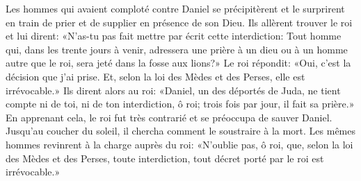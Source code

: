 Les hommes qui avaient comploté contre Daniel se précipitèrent
	et le surprirent en train de prier et de supplier en présence de son Dieu.
Ils allèrent trouver le roi et lui dirent:
	«N’as-tu pas fait mettre par écrit cette interdiction:
	Tout homme qui, dans les trente jours à venir,
		adressera une prière à un dieu ou à un homme autre que le roi,
	sera jeté dans la fosse aux lions?»
Le roi répondit: «Oui, c’est la décision que j’ai prise.
	Et, selon la loi des Mèdes et des Perses, elle est irrévocable.»
Ils dirent alors au roi:
	«Daniel, un des déportés de Juda,
	ne tient compte ni de toi, ni de ton interdiction, ô roi;
	trois fois par jour, il fait sa prière.»
En apprenant cela, le roi fut très contrarié et se préoccupa de sauver Daniel.
	Jusqu’au coucher du soleil, il chercha comment le soustraire à la mort.
Les mêmes hommes revinrent à la charge auprès du roi:
	«N’oublie pas, ô roi, que, selon la loi des Mèdes et des Perses,
	toute interdiction, tout décret porté par le roi est irrévocable.»
